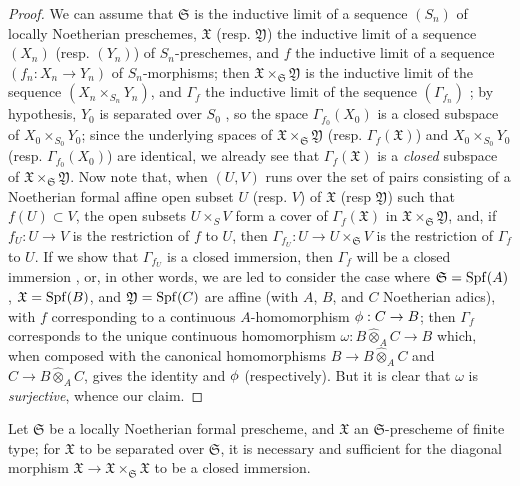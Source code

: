 \begin{proof}
\label{proof-1.10.15.4}
We can assume that $\mathfrak{S}$ is the inductive limit of a sequence $(S_n)$ of locally Noetherian preschemes, $\mathfrak{X}$ (resp. $\mathfrak{Y}$) the inductive limit of a sequence $(X_n)$ (resp. $(Y_n)$) of $S_n$-preschemes, and $f$ the inductive limit of a sequence $(f_n:X_n\to Y_n)$ of $S_n$-morphisms;
then $\mathfrak{X}\times_\mathfrak{S}\mathfrak{Y}$ is the inductive limit of the sequence $(X_n\times_{S_n}Y_n)$, and $\Gamma_f$ the inductive limit of the sequence $(\Gamma_{f_n})$ ;
by hypothesis, $Y_0$ is separated over $S_0$ , so the space $\Gamma_{f_0}(X_0)$ is a closed subspace of $X_0\times_{S_0}Y_0$;
since the underlying spaces of $\mathfrak{X}\times_\mathfrak{S}\mathfrak{Y}$ (resp. $\Gamma_f(\mathfrak{X})$) and $X_0\times_{S_0}Y_0$ (resp. $\Gamma_{f_0}(X_0)$) are identical, we already see that $\Gamma_f(\mathfrak{X})$ is a \emph{closed} subspace of $\mathfrak{X}\times_\mathfrak{S}\mathfrak{Y}$.
Now note that, when $(U,V)$ runs over the set of pairs consisting of a Noetherian formal affine open subset $U$ (resp. $V$) of $\mathfrak{X}$ (resp $\mathfrak{Y}$) such that $f(U)\subset V$, the open subsets $U\times_S V$ form a cover of $\Gamma_f(\mathfrak{X})$ in $\mathfrak{X}\times_\mathfrak{S}\mathfrak{Y}$, and, if $f_U:U\to V$ is the restriction of $f$ to $U$, then $\Gamma_{f_U}:U\to U\times_\mathfrak{S}V$ is the restriction of $\Gamma_f$ to $U$.
If we show that $\Gamma_{f_U}$ is a closed immersion, then $\Gamma_f$ will be a closed immersion , or, in other words, we are led to consider the case where $\mathfrak{S}=\operatorname{Spf}(A)$, $\mathfrak{X}=\operatorname{Spf}(B)$, and $\mathfrak{Y}=\operatorname{Spf}(C)$ are affine (with $A$, $B$, and $C$ Noetherian adics), with $f$ corresponding to a continuous $A$-homomorphism $\vphi:C\to B$;
then $\Gamma_f$ corresponds to the unique continuous homomorphism $\omega: B\widehat{\otimes}_A C\to B$ which, when composed with the canonical homomorphisms $B\to B\widehat{\otimes}_A C$ and $C\to B\widehat{\otimes}_A C$, gives the identity and $\phi$ (respectively).
But it is clear that $\omega$ is \emph{surjective}, whence our claim.
\end{proof}

\begin{corollary}[10.15.5]
\label{1.10.15.5}
Let $\mathfrak{S}$ be a locally Noetherian formal prescheme, and $\mathfrak{X}$ an $\mathfrak{S}$-prescheme of finite type;
for $\mathfrak{X}$ to be separated over $\mathfrak{S}$, it is necessary and sufficient for the diagonal morphism $\mathfrak{X}\to\mathfrak{X}\times_\mathfrak{S}\mathfrak{X}$ to be a closed immersion.
\end{corollary}

